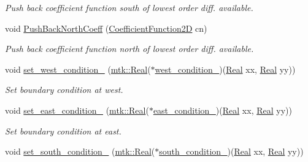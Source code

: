 \begin{DoxyCompactItemize}
\begin{DoxyCompactList}\small\item\em Push back coefficient function south of lowest order diff. available. \end{DoxyCompactList}\item 
void \hyperlink{classmtk_1_1BCDescriptor2D_a0fed58bd058d699a572888fe4b9934a4}{Push\+Back\+North\+Coeff} (\hyperlink{group__c07-mim__ops_ga0322dd5a158c1864242833ec224ee4c1}{Coefficient\+Function2\+D} cn)
\begin{DoxyCompactList}\small\item\em Push back coefficient function north of lowest order diff. available. \end{DoxyCompactList}\item 
void \hyperlink{classmtk_1_1BCDescriptor2D_aa68984b82fa748dc51c0b448104f015f}{set\+\_\+west\+\_\+condition\+\_\+} (\hyperlink{group__c01-roots_gac080bbbf5cbb5502c9f00405f894857d}{mtk\+::\+Real}($\ast$\hyperlink{classmtk_1_1BCDescriptor2D_a98bfe7ea4256d0777a6b19d1701645db}{west\+\_\+condition\+\_\+})(\hyperlink{group__c01-roots_gac080bbbf5cbb5502c9f00405f894857d}{Real} xx, \hyperlink{group__c01-roots_gac080bbbf5cbb5502c9f00405f894857d}{Real} yy))
\begin{DoxyCompactList}\small\item\em Set boundary condition at west. \end{DoxyCompactList}\item 
void \hyperlink{classmtk_1_1BCDescriptor2D_a2e555f1c7058522afdae45c372f36a33}{set\+\_\+east\+\_\+condition\+\_\+} (\hyperlink{group__c01-roots_gac080bbbf5cbb5502c9f00405f894857d}{mtk\+::\+Real}($\ast$\hyperlink{classmtk_1_1BCDescriptor2D_ad63ffb74a62474e753e135324e6462d0}{east\+\_\+condition\+\_\+})(\hyperlink{group__c01-roots_gac080bbbf5cbb5502c9f00405f894857d}{Real} xx, \hyperlink{group__c01-roots_gac080bbbf5cbb5502c9f00405f894857d}{Real} yy))
\begin{DoxyCompactList}\small\item\em Set boundary condition at east. \end{DoxyCompactList}\item 
void \hyperlink{classmtk_1_1BCDescriptor2D_ae7aaa690a6e0d972ea9380cc77bf7a73}{set\+\_\+south\+\_\+condition\+\_\+} (\hyperlink{group__c01-roots_gac080bbbf5cbb5502c9f00405f894857d}{mtk\+::\+Real}($\ast$\hyperlink{classmtk_1_1BCDescriptor2D_ae4e7cdb5e7007c5ab09b6c0efb329943}{south\+\_\+condition\+\_\+})(\hyperlink{group__c01-roots_gac080bbbf5cbb5502c9f00405f894857d}{Real} xx, \hyperlink{group__c01-roots_gac080bbbf5cbb5502c9f00405f894857d}{Real} yy))

\end{DoxyCompactItemize}
